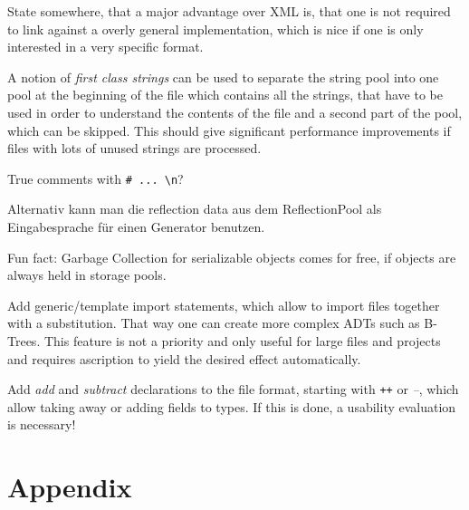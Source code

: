 \documentclass[a4paper,10pt]{article}
\begin{document}
State somewhere, that a major advantage over XML is, that one is not required to link against a overly general implementation, which is nice if one is only interested in a very specific format.

A notion of \textit{first class strings} can be used to separate the string pool into one pool at the beginning of the file which contains all the strings, that have to be used in order to understand the contents of the file and a second part of the pool, which can be skipped. This should give significant performance improvements if files with lots of unused strings are processed.

True comments with \verb/# ... \n/?

Alternativ kann man die reflection data aus dem ReflectionPool als Eingabesprache für einen Generator benutzen.

Fun fact: Garbage Collection for serializable objects comes for free, if objects are always held in storage pools.

Add generic/template import statements, which allow to import files together with a substitution. That way one can create more complex ADTs such as B-Trees. This feature is not a priority and only useful for large files and projects and requires ascription to yield the desired effect automatically.

Add \textit{add} and \textit{subtract} declarations to the file format, starting with \texttt{++} or \textit{--}, which allow taking away or adding fields to types. If this is done, a usability evaluation is necessary!

\newpage
\todos

\part{Appendix}
\renewcommand\thesection{\Alph{section}}
\setcounter{section}{0}





\newpage
\printglossaries



\end{document}
